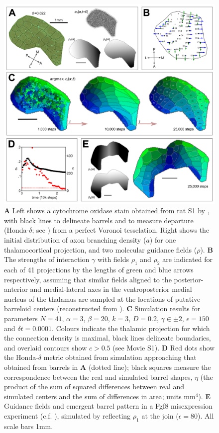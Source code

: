 \documentclass[9pt,lineno]{elife}
\begin{document}
\begin{figure}
\begin{fullwidth}
\includegraphics[width=\linewidth]{./MainFig_superlowres.png}
\caption{\textbf{A} Left shows a cytochrome oxidase stain obtained from rat S1
  by \cite{zheng_signal_2001}, with black lines to delineate barrels and to
  measure departure (Honda-$\delta$; see \citealp{senft_mouse_1991}) from a
  perfect Voronoi tesselation. Right shows the initial distribution of axon
  branching density ($a$) for one thalamocortical projection, and two
  molecular guidance fields ($\rho$). \textbf{B} The strengths of interaction
  $\gamma$ with fields $\rho_1$ and $\rho_2$ are indicated for each of 41
  projections by the lengths of green and blue arrows respectively, assuming
  that similar fields aligned to the posterior-anterior and medial-lateral
  axes in the ventroposterior medial nucleus of the thalamus are sampled at
  the locations of putative barreloid centers (reconstructed from
  \citealp{haidarliu_size_2001}). \textbf{C} Simulation results for parameters
  $N=41$, $\alpha=3$, $\beta=20$, $k=3$, $D=0.2$, $\gamma\in\pm 2$,
  $\epsilon=150$ and $\delta{t}=0.0001$. Colours indicate the thalamic
  projection for which the connection density is maximal, black lines
  delineate boundaries, and overlaid contours show $c>0.5$ (see Movie
  S1). \textbf{D} Red dots show the Honda-$\delta$ metric obtained from
  simulation approaching that obtained from barrels in \textbf{A} (dotted
  line); black squares measure the correspondence between the real and
  simulated barrel shapes, $\eta$ (the product of the sum of squared
  differences between real and simulated centers and the sum of differences in
  area; units mm$^4$). \textbf{E} Guidance fields and emergent barrel pattern
  in a Fgf8 misexpression experiment
  (c.f. \citealp{assimacopoulos_fibroblast_2012}), simulated by reflecting
  $\rho_1$ at the join ($\epsilon=80$). All scale bars 1mm.}
\label{fig:main}
\end{fullwidth}
\end{figure}
\end{document}
